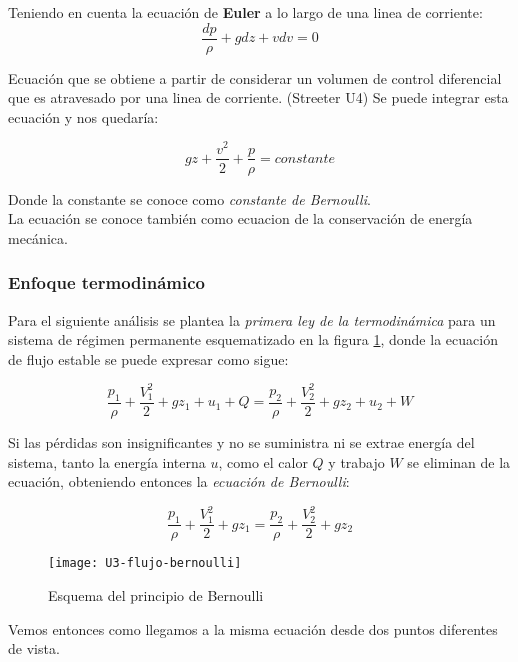 Teniendo en cuenta la ecuación de \textbf{Euler} a lo largo de una linea de corriente:
\begin{equation}
	\dfrac{dp}{\rho} + g dz + v dv = 0
\end{equation}

Ecuación que se obtiene a partir de considerar un volumen de control diferencial que es atravesado por una linea de corriente. (Streeter U4)
Se puede integrar esta ecuación y nos quedaría:

\begin{equation}
	g z + \dfrac{v^{2}}{2} + \dfrac{p}{\rho} = constante
\end{equation}

Donde la constante se conoce como \emph{constante de Bernoulli}. \\

La ecuación se conoce también como ecuacion de la conservación de energía mecánica.
\subsubsection{Enfoque termodinámico}

Para el siguiente análisis se plantea la \emph{primera ley de la termodinámica} para un sistema de régimen permanente esquematizado en la figura \ref{fig:ecuacion-de-bernoulli}, donde la ecuación de flujo estable se puede expresar como sigue:

\begin{equation*}
 \dfrac{p_1}{\rho} +	\dfrac{V_1^2}{2} + g z_1 + u_1 + Q=  \dfrac{p_2}{\rho} + \dfrac{V_2^2}{2} + g z_2 + u_2 + W
\end{equation*}


Si las pérdidas son insignificantes y no se suministra ni se extrae energía del sistema, tanto la energía interna $u$, como el calor $Q$ y trabajo $W$ se eliminan de la ecuación, obteniendo entonces la \emph{ecuación de Bernoulli}:

\begin{equation}
	\dfrac{p_1}{\rho} +	\dfrac{V_1^2}{2} + g z_1 =  \dfrac{p_2}{\rho} + \dfrac{V_2^2}{2} + g z_2
	\label{eq:bernoulli}
\end{equation}

\begin{figure}[H]
	\centering
	\texttt{[image: U3-flujo-bernoulli]}
	\caption{Esquema del principio de Bernoulli}
	\label{fig:ecuacion-de-bernoulli}
\end{figure}

Vemos entonces como llegamos a la misma ecuación desde dos puntos diferentes de vista.

